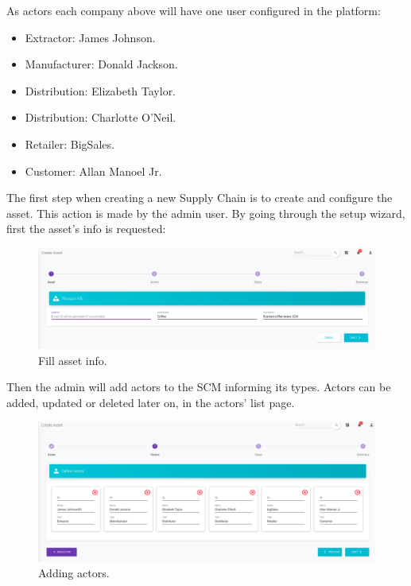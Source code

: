 As actors each company above will have one user configured in the platform:  

\begin{itemize}
\item Extractor: James Johnson.
\item Manufacturer: Donald Jackson.
\item Distribution: Elizabeth Taylor.
\item Distribution: Charlotte O'Neil.
\item Retailer: BigSales.
\item Customer: Allan Manoel Jr.
\end{itemize}

The first step when creating a new Supply Chain  is to create and configure the asset. This action is made by the admin user. By going through the setup wizard, first the asset's info is requested:

\begin{figure}[H]
\begin{center}
  \includegraphics[scale=0.27]{images/use_example/01_create_asset_1.png}
\caption{Fill asset info.}
\label{fig:create_asset_1}
\end{center}
\end{figure}

Then the admin will add actors to the SCM informing its types. Actors can be added, updated or deleted later on, in the actors' list page.

\begin{figure}[H]
\begin{center}
  \includegraphics[scale=0.27]{images/use_example/02_create_asset_2.png}
\caption{Adding actors.}
\label{fig:create_asset_2}
\end{center}
\end{figure}


